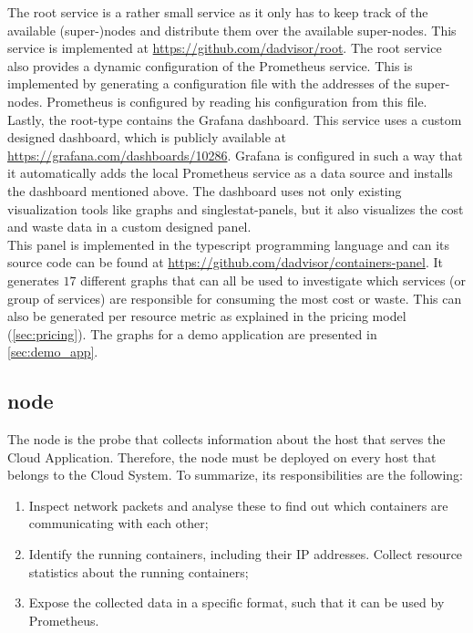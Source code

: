 \noindent
The root service is a rather small service as it only has to keep track of the available (super-)nodes and distribute them over the available super-nodes. This service is implemented at \url{https://github.com/dadvisor/root}. The root service also provides a dynamic configuration of the Prometheus service. This is implemented by generating a configuration file with the addresses of the super-nodes. Prometheus is configured by reading his configuration from this file.\\

\noindent
Lastly, the root-type contains the Grafana dashboard. This service uses a custom designed dashboard, which is publicly available at \url{https://grafana.com/dashboards/10286}. Grafana is configured in such a way that it automatically adds the local Prometheus service as a data source and installs the dashboard mentioned above. The dashboard uses not only existing visualization tools like graphs and singlestat-panels, but it also visualizes the cost and waste data in a custom designed panel.\\

\noindent
This panel is implemented in the typescript programming language and can its source code can be found at \url{https://github.com/dadvisor/containers-panel}. It generates $17$ different graphs that can all be used to investigate which services (or group of services) are responsible for consuming the most cost or waste. This can also be generated per resource metric as explained in the pricing model (\autoref{sec:pricing}). The graphs for a demo application are presented in \autoref{sec:demo_app}.

\subsection{node} \label{sec:node_imp}
The node is the probe that collects information about the host that serves the Cloud Application. Therefore, the node must be deployed on every host that belongs to the Cloud System. To summarize, its responsibilities are the following:
\begin{enumerate}
    \item Inspect network packets and analyse these to find out which containers are communicating with each other;
    \item Identify the running containers, including their IP addresses. Collect resource statistics about the running containers;
    \item Expose the collected data in a specific format, such that it can be used by Prometheus.
\end{enumerate}


